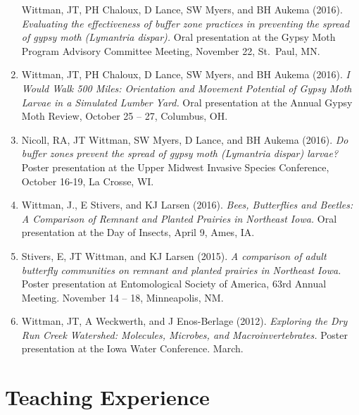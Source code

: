 \documentclass[11pt, a4paper]{awesome-cv}
\begin{document}
\begin{enumerate}
  Wittman, JT, PH Chaloux, D Lance, SW Myers, and BH Aukema (2016). \emph{Evaluating the effectiveness of buffer zone practices in preventing the spread of gypsy moth (Lymantria dispar).} Oral presentation at the Gypsy Moth Program Advisory Committee Meeting, November 22, St.~Paul, MN.
\item
  Wittman, JT, PH Chaloux, D Lance, SW Myers, and BH Aukema (2016). \emph{I Would Walk 500 Miles: Orientation and Movement Potential of Gypsy Moth Larvae in a Simulated Lumber Yard.} Oral presentation at the Annual Gypsy Moth Review, October 25 -- 27, Columbus, OH.
\item
  Nicoll, RA, JT Wittman, SW Myers, D Lance, and BH Aukema (2016). \emph{Do buffer zones prevent the spread of gypsy moth (\emph{Lymantria dispar}) larvae?} Poster presentation at the Upper Midwest Invasive Species Conference, October 16-19, La Crosse, WI.
\item
  Wittman, J., E Stivers, and KJ Larsen (2016). \emph{Bees, Butterflies and Beetles: A Comparison of Remnant and Planted Prairies in Northeast Iowa.} Oral presentation at the Day of Insects, April 9, Ames, IA.
\item
  Stivers, E, JT Wittman, and KJ Larsen (2015). \emph{A comparison of adult butterfly communities on remnant and planted prairies in Northeast Iowa.} Poster presentation at Entomological Society of America, 63rd Annual Meeting. November 14 -- 18, Minneapolis, NM.
\item
  Wittman, JT, A Weckwerth, and J Enos-Berlage (2012). \emph{Exploring the Dry Run Creek Watershed: Molecules, Microbes, and Macroinvertebrates.} Poster presentation at the Iowa Water Conference. March.
\end{enumerate}

\hypertarget{teaching-experience}{%
\section{Teaching Experience}\label{teaching-experience}}
\end{document}

